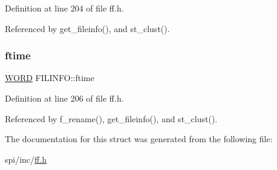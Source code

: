 Definition at line 204 of file ff.\+h.



Referenced by get\+\_\+fileinfo(), and st\+\_\+clust().

\mbox{\label{structFILINFO_ae0f751b79621bf7b29669f177bbe6b9a}} 
\subsubsection{\texorpdfstring{ftime}{ftime}}
{\footnotesize\ttfamily \hyperlink{integer_8h_a197942eefa7db30960ae396d68339b97}{W\+O\+RD} F\+I\+L\+I\+N\+F\+O\+::ftime}



Definition at line 206 of file ff.\+h.



Referenced by f\+\_\+rename(), get\+\_\+fileinfo(), and st\+\_\+clust().



The documentation for this struct was generated from the following file\+:\begin{DoxyCompactItemize}
\item 
spi/inc/\hyperlink{ff_8h}{ff.\+h}\end{DoxyCompactItemize}
